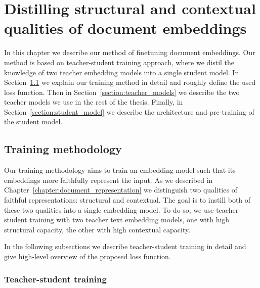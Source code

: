 \chapter{Distilling structural and contextual qualities of document
embeddings}\label{chapter:training_method}

In this chapter we describe our method of finetuning document embeddings. Our
method is based on teacher-student training approach, where we distil the
knowledge of two teacher embedding models into a single student model. In
Section~\ref{section:training_method} we explain our training method in detail
and roughly define the used loss function. Then in
Section~\ref{section:teacher_models} we describe the two teacher models we use
in the rest of the thesis. Finally, in Section~\ref{section:student_model} we
describe the architecture and pre-training of the student model.

\section{Training methodology}\label{section:training_method}


Our training methodology aims to train an embedding model such that its
embeddings more faithfully represent the input. As we described in
Chapter~\ref{chapter:document_representation} we distinguish two qualities of
faithful representations: structural and contextual. The goal is to instill
both of these two qualities into a single embedding model. To do so, we use
teacher-student training with two teacher text embedding models, one with high
structural capacity, the other with high contextual capacity.

In the following subsections we describe teacher-student training in detail and
give high-level overview of the proposed loss function.

\subsection{Teacher-student training}

